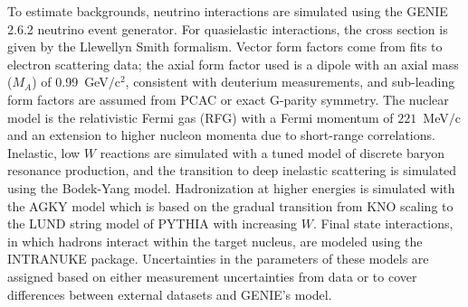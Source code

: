 \documentclass[aps,prl,twocolumn,showpacs,superscriptaddress,nofootinbib]{revtex4}
\begin{document}
To estimate backgrounds, neutrino interactions are simulated using the GENIE 2.6.2 neutrino
event generator\cite{Andreopoulos201087}.  For quasielastic
interactions, the cross section is given by the Llewellyn Smith
formalism\cite{LlewellynSmith:1971zm}.  Vector form factors come from
fits to electron scattering data\cite{Bradford:2006yz}; the axial
form factor used is a dipole with an axial mass ($M_A$) of
0.99~GeV$/$c$^2$, consistent with deuterium
measurements\cite{Bodek:2007vi,Kuzmin:2007kr}, and sub-leading form
factors are assumed from 
PCAC
or exact G-parity
symmetry\cite{Day:2012gb}.  The nuclear model is the relativistic
Fermi gas (RFG) with a Fermi momentum of
$221$~MeV$/$c and an extension to higher nucleon momenta due to short-range
correlations\cite{Bodek:1980ar,Bodek:1981wr}. Inelastic, low $W$ 
reactions are simulated with a tuned model of discrete baryon resonance
production\cite{Rein:1980wg}, and the transition to deep inelastic
scattering is simulated using the Bodek-Yang
model\cite{Bodek:2004pc}. 
Hadronization at higher energies is simulated with the AGKY model\cite{Yang:2009zx} which is based on the gradual transition
from KNO scaling to the LUND string model of PYTHIA with increasing $W$.
Final state interactions, in which hadrons
interact within the target nucleus, are modeled using the INTRANUKE
package\cite{Andreopoulos201087}.  
Uncertainties in the parameters of these models are assigned based on either measurement uncertainties
from data or to cover differences between external datasets and GENIE's model. 





\end{document}
